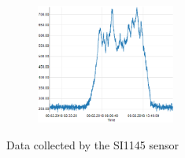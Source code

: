 \documentclass[bachelorthesis, grey, english]{mas-thesis-chapters} %
\begin{document}
\begin{figure}
\par\medskip
\begin{subfigure}[c]{\textwidth}
\centering
\includegraphics[width=0.5\textwidth]{expEval/VIS_09-02-2018.PNG}
\label{fig:evalVIS}
\end{subfigure}
\caption{Data collected by the SI1145 sensor}
\end{figure}

\end{document}
